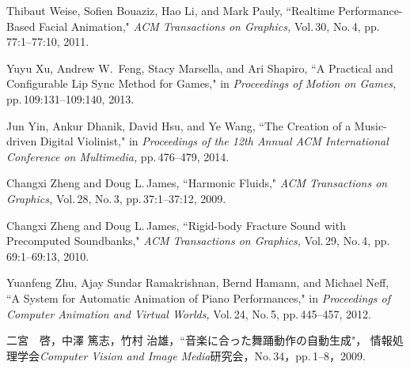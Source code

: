 \begin{thebibliography}{55}
Thibaut Weise, Sofien Bouaziz, Hao Li, and Mark Pauly,
 ``Realtime Performance-Based Facial Animation,"
 \textit{ACM Transactions on Graphics,} Vol.\,30, No.\,4, pp.\,77:1--77:10, 2011.

Yuyu Xu, Andrew W.\, Feng, Stacy Marsella, and Ari Shapiro,
 ``A Practical and Configurable Lip Sync Method for Games,"
 in \textit{Proceedings of Motion on Games,} pp.\,109:131--109:140, 2013.

Jun Yin, Ankur Dhanik, David Hsu, and Ye Wang,
 ``The Creation of a Music-driven Digital Violinist,"
 in \textit{Proceedings of the 12th Annual ACM International Conference on Multimedia,} pp.\,476--479, 2014.

Changxi Zheng and Doug L.\,James,
 ``Harmonic Fluids,"
 \textit{ACM Transactions on Graphics,} Vol.\,28, No.\,3, pp.\,37:1--37:12, 2009.

Changxi Zheng and Doug L.\,James,
 ``Rigid-body Fracture Sound with Precomputed Soundbanks,"
 \textit{ACM Transactions on Graphics,} Vol.\,29, No.\,4, pp.\,69:1--69:13, 2010.

Yuanfeng Zhu, Ajay Sundar Ramakrishnan, Bernd Hamann, and Michael Neff,
 ``A System for Automatic Animation of Piano Performances,"
 in \textit{Proceedings of Computer Animation and Virtual Worlds,} Vol.\,24, No.\,5, pp.\,445--457, 2012.
 
二宮　啓，中澤 篤志，竹村 治雄，``音楽に合った舞踊動作の自動生成"，
 情報処理学会\textit{Computer Vision and Image Media}研究会，No.\,34，pp.\,1--8，2009.

\end{thebibliography}